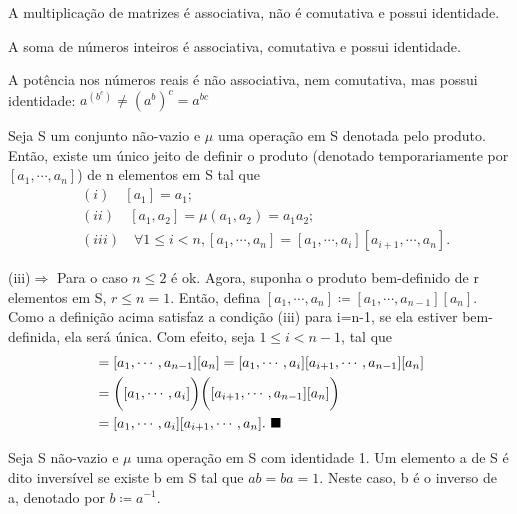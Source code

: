\documentclass[Algebra/algebra_notes.tex]{subfiles}
\begin{document}
\begin{example*}
	A multiplicação de matrizes é associativa, não é comutativa e possui identidade.
\end{example*}
\begin{example*}
	A soma de números inteiros é associativa, comutativa e possui identidade.
\end{example*}
\begin{example*}
	A potência nos números reais é não associativa, nem comutativa, mas possui identidade: $a^{(b^{c})} \neq (a^{b})^{c} = a^{bc}$
\end{example*}

\begin{prop*}
	Seja S um conjunto não-vazio e $\mu$ uma operação em S denotada pelo produto. Então, existe um único jeito de definir o
	produto (denotado temporariamente por $[a_{1}, \cdots, a_{n}]$) de n elementos em S tal que
	\begin{align*}
		 & (i)\quad [a_{1}] = a_{1};                                                                              \\
		 & (ii)\quad [a_{1}, a_{2}] = \mu(a_{1}, a_{2}) = a_{1}a_{2};                                             \\
		 & (iii)\quad\forall 1\leq{i}<n, [a_{1}, \cdots, a_{n}] = [a_{1}, \cdots, a_{i}][a_{i+1}, \cdots, a_{n}].
	\end{align*}
\end{prop*}
\begin{proof*}
	(iii)$\Rightarrow$ Para o caso $n\leq{2}$ é ok. Agora, suponha o produto bem-definido de r elementos em S, $r\leq{n=1}$. Então,
	defina $[a_{1}, \cdots, a_{n}]\coloneqq [a_{1}, \cdots, a_{n-1}][a_{n}]. $ Como a definição acima satisfaz a condição (iii) para
	i=n-1, se ela estiver bem-definida, ela será única. Com efeito, seja $1\leq{i}<n-1$, tal que
	\begin{align*}
		[a_{1}, \cdots, a_{n}] & = [a_{1}, \cdots, a_{n-1}][a_{n}] = [a_{1}, \cdots, a_{i}][a_{i+1}, \cdots, a_{n-1}][a_{n}] \\
		                       & = \biggl([a_{1}, \cdots, a_{i}]\biggr)\biggl([a_{i+1}, \cdots, a_{n-1}][a_{n}]\biggr)       \\
		                       & = [a_{1}, \cdots, a_{i}][a_{i+1}, \cdots, a_{n}].\text{ \qedsymbol}
	\end{align*}
\end{proof*}
\begin{def*}
	Seja S não-vazio e $\mu$ uma operação em S com identidade 1. Um elemento a de S é dito inversível se existe b em S tal que
	$ab = ba = 1.$ Neste caso, b é o inverso de a, denotado por $b\coloneqq a^{-1}$.
\end{def*}
\end{document}

